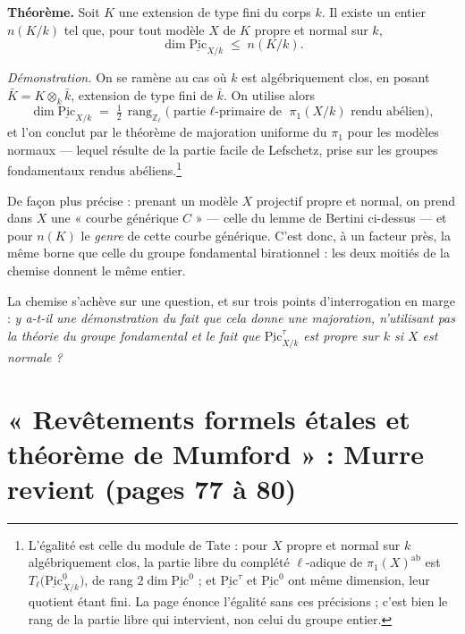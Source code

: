 \documentclass[11pt,a4paper]{article}
\begin{document}
\textbf{Théorème.} Soit $K$ une extension de type fini du corps $k$. Il existe
un entier $n(K/k)$ tel que, pour tout modèle $X$ de $K$ propre et normal sur
$k$,
\[
  \dim \underline{\mathrm{Pic}}_{X/k} \;\leqslant\; n(K/k) .
\]

\emph{Démonstration.} On se ramène au cas où $k$ est algébriquement clos, en
posant $\bar{K} = K \otimes_{k} \bar{k}$, extension de type fini de $\bar{k}$.
On utilise alors
\[
  \dim \underline{\mathrm{Pic}}_{X/k} \;=\; \tfrac{1}{2}\,
  \operatorname{rang}_{\mathbb{Z}_{\ell}}
  \bigl(\text{partie $\ell$-primaire de } \pi_{1}(X/k) \text{ rendu
  abélien}\bigr) ,
\]
et l'on conclut par le théorème de majoration uniforme du $\pi_{1}$ pour les
modèles normaux --- lequel résulte de la partie facile de Lefschetz, prise sur
les groupes fondamentaux rendus abéliens.\footnote{L'égalité est celle du
module de Tate : pour $X$ propre et normal sur $k$ algébriquement clos, la
partie libre du complété $\ell$-adique de $\pi_{1}(X)^{\mathrm{ab}}$ est
$T_{\ell}\bigl(\underline{\mathrm{Pic}}^{0}_{X/k}\bigr)$, de rang
$2\dim\underline{\mathrm{Pic}}^{0}$ ; et $\underline{\mathrm{Pic}}^{\tau}$ et
$\underline{\mathrm{Pic}}^{0}$ ont même dimension, leur quotient étant fini.
La page énonce l'égalité sans ces précisions ; c'est bien le rang de la partie
libre qui intervient, non celui du groupe entier.}

De façon plus précise : prenant un modèle $X$ projectif propre et normal, on
prend dans $X$ une « courbe générique $C$ » --- celle du lemme de Bertini
ci-dessus --- et pour $n(K)$ le \emph{genre} de cette courbe générique. C'est
donc, à un facteur près, la même borne que celle du groupe fondamental
birationnel : les deux moitiés de la chemise donnent le même entier.


La chemise s'achève sur une question, et sur trois points d'interrogation en
marge : \emph{y a-t-il une démonstration du fait que cela donne une majoration,
n'utilisant pas la théorie du groupe fondamental et le fait que
$\underline{\mathrm{Pic}}^{\tau}_{X/k}$ est propre sur $k$ si $X$ est normale ?}

\section*{« Revêtements formels étales et théorème de Mumford » : Murre revient (pages 77 à 80)}
\end{document}
